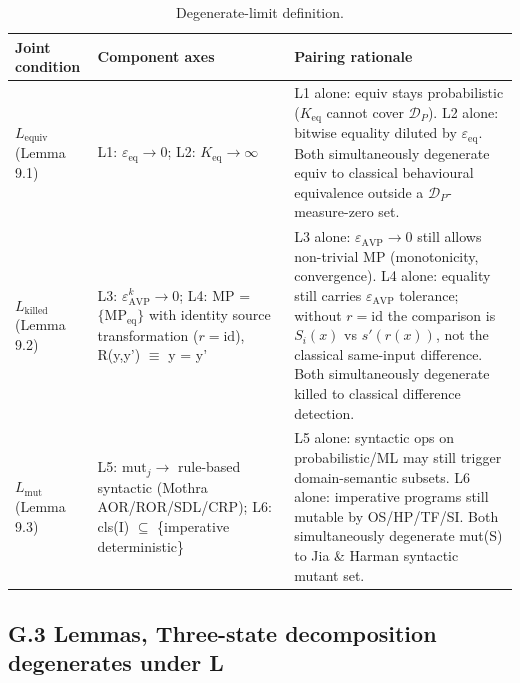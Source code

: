 \documentclass[manuscript,screen,review]{acmart}
\begin{document}
{%
\begin{longtable}[]{@{}
  >{\raggedright\arraybackslash}p{}
  >{\raggedright\arraybackslash}p{}
  >{\raggedright\arraybackslash}p{}@{}}
\caption{Degenerate-limit definition.}\label{tab:p2-29}\\
\toprule\noalign{}
\begin{minipage}[b]{\linewidth}\raggedright
Joint condition
\end{minipage} & \begin{minipage}[b]{\linewidth}\raggedright
Component axes
\end{minipage} & \begin{minipage}[b]{\linewidth}\raggedright
Pairing rationale
\end{minipage} \\
\midrule\noalign{}
\endfirsthead
\endhead
\bottomrule\noalign{}
\endlastfoot
\textbf{$L_{\mathrm{equiv}}$} (Lemma 9.1) & L1: $\varepsilon_{\mathrm{eq}} \to 0$; L2: $K_{\mathrm{eq}} \to \infty$ & L1 alone:
equiv stays probabilistic ($K_{\mathrm{eq}}$ cannot cover $\mathcal{D}_P$). L2 alone: bitwise
equality diluted by $\varepsilon_{\mathrm{eq}}$. Both simultaneously degenerate equiv to
classical behavioural equivalence outside a $\mathcal{D}_P$-measure-zero set. \\
\textbf{$L_{\mathrm{killed}}$} (Lemma 9.2) & L3: $\varepsilon_{\mathrm{AVP}}^k \to 0$; L4: MP =
$\{\mathrm{MP}_{\mathrm{eq}}\}$ with identity source transformation
($r = \mathrm{id}$), R(y,y') $\equiv$ y = y' & L3 alone: $\varepsilon_{\mathrm{AVP}} \to 0$ still allows
non-trivial MP (monotonicity, convergence). L4 alone: equality still
carries $\varepsilon_{\mathrm{AVP}}$ tolerance; without $r = \mathrm{id}$
the comparison is $S_i(x)$ vs $s'(r(x))$, not the classical same-input
difference. Both simultaneously degenerate killed to
classical difference detection. \\
\textbf{$L_{\mathrm{mut}}$} (Lemma 9.3) & L5: $\mathrm{mut}_j \to$ rule-based syntactic (Mothra
AOR/ROR/SDL/CRP); L6: cls(I) $\subseteq$ \{imperative deterministic\} & L5 alone:
syntactic ops on probabilistic/ML may still trigger domain-semantic
subsets. L6 alone: imperative programs still mutable by OS/HP/TF/SI.
Both simultaneously degenerate mut(S) to Jia \& Harman syntactic mutant
set. \\
\end{longtable}
}

\subsection{G.3 Lemmas, Three-state decomposition degenerates under L}\label{g.3-lemmas-three-state-decomposition-degenerates-under-l}
\end{document}
